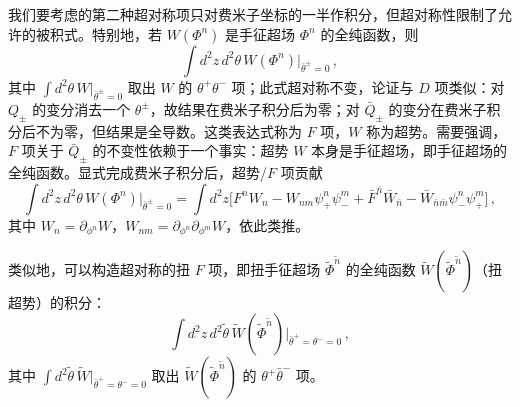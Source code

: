 我们要考虑的第二种超对称项只对费米子坐标的一半作积分，但超对称性限制了允许的被积式。特别地，若 $W(\Phi^n)$ 是手征超场 $\Phi^n$ 的全纯函数，则
\begin{equation}
\int d^2z\,d^2\theta\,W(\Phi^n)\big|_{\bar\theta^\pm=0}\,,
\tag{2.25}
\end{equation}
其中 $\int d^2\theta\,W|_{\bar\theta^\pm=0}$ 取出 $W$ 的 $\theta^+\theta^-$ 项；此式超对称不变，论证与 $D$ 项类似：对 $Q_\pm$ 的变分消去一个 $\theta^\pm$，故结果在费米子积分后为零；对 $\bar Q_\pm$ 的变分在费米子积分后不为零，但结果是全导数。这类表达式称为 $F$ 项，$W$ 称为超势。需要强调，$F$ 项关于 $\bar Q_\pm$ 的不变性依赖于一个事实：超势 $W$ 本身是手征超场，即手征超场的全纯函数。显式完成费米子积分后，超势/$F$ 项贡献
\begin{equation}
\int d^2z\,d^2\theta\,W(\Phi^n)\big|_{\bar\theta^\pm=0}=\int d^2z\big[F^nW_n-W_{nm}\psi^n_+\psi^m_-+\bar F^{\bar n}\bar W_{\bar n}-\bar W_{\bar n\bar m}\psi^n_-\psi^m_+\big]\,,
\tag{2.26}
\end{equation}
其中 $W_n=\partial_{\phi^n}W$，$W_{nm}=\partial_{\phi^n}\partial_{\phi^m}W$，依此类推。

类似地，可以构造超对称的扭 $F$ 项，即扭手征超场 $\tilde\Phi^{\tilde n}$ 的全纯函数 $\tilde W(\tilde\Phi^{\tilde n})$（扭超势）的积分：
\begin{equation}
\int d^2z\,d^2\tilde\theta\,\tilde W(\tilde\Phi^{\tilde n})\big|_{\bar\theta^+=\theta^-=0}\,,
\tag{2.27}
\end{equation}
其中 $\int d^2\tilde\theta\,\tilde W|_{\bar\theta^+=\theta^-=0}$ 取出 $\tilde W(\tilde\Phi^{\tilde n})$ 的 $\theta^+\bar\theta^-$ 项。

